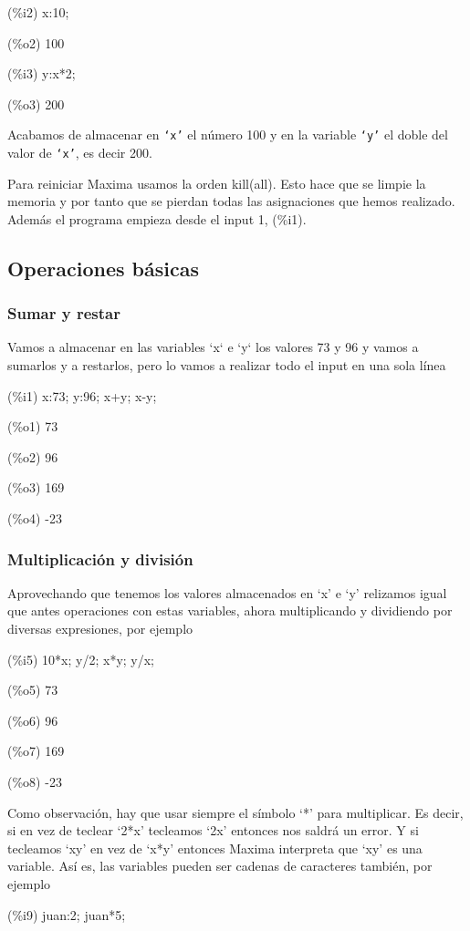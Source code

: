 \documentclass[a4paper, 12pt] {article}
\begin{document}
(\%i2) x:10;

(\%o2) 100

(\%i3) y:x*2;

(\%o3) 200

Acabamos de almacenar en \texttt{`x'} el número 100 y en la variable \texttt{`y'} el doble del valor de \texttt{`x'}, es decir 200.

Para reiniciar Maxima usamos la orden kill(all). Esto hace que se limpie la memoria y por tanto que se pierdan todas las asignaciones que hemos realizado. Además el programa empieza desde el input 1, (\%i1).

\subsection{Operaciones básicas}
\subsubsection{Sumar y restar}
Vamos a almacenar en las variables `x` e `y` los valores 73 y 96 y vamos a sumarlos y a restarlos, pero lo vamos a realizar todo el input en una sola línea

(\%i1) x:73; y:96; x+y; x-y;

  (\%o1) 73

  (\%o2) 96

  (\%o3) 169

  (\%o4) -23

\subsubsection{Multiplicación y división}
Aprovechando que tenemos los valores almacenados en `x' e `y' relizamos igual que antes operaciones con estas variables, ahora multiplicando y dividiendo por diversas expresiones, por ejemplo

(\%i5) 10*x; y/2; x*y; y/x;

  (\%o5) 73

  (\%o6) 96

  (\%o7) 169

  (\%o8) -23

Como observación, hay que usar siempre el símbolo `*' para multiplicar. Es decir, si en vez de teclear `2*x' tecleamos `2x' entonces nos saldrá un error. Y si tecleamos `xy' en vez de `x*y' entonces Maxima interpreta que `xy' es una variable. Así es, las variables pueden ser cadenas de caracteres también, por ejemplo

(\%i9) juan:2; juan*5;
\end{document}
